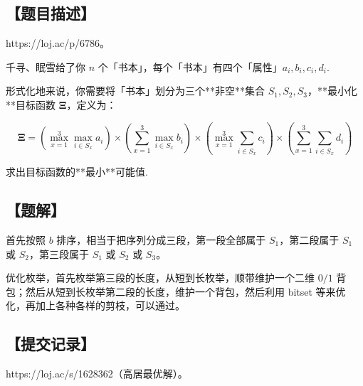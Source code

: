 \documentclass[UTF8,12pt,a4paper]{ctexart}
\begin{document}
	\subsection*{【题目描述】}
	
	https://loj.ac/p/6786。
	
	千寻、眠雪给了你 $n$ 个「书本」，每个「书本」有四个「属性」$a_i,b_i,c_i,d_i$.
	
	形式化地来说，你需要将「书本」划分为三个**非空**集合 $S_1,S_2,S_3$，**最小化**目标函数 $\mathbf{\Xi}$，定义为：
	
	$$
	\mathbf{\Xi}=\left(\max_{x=1}^3\max_{i\in S_x}a_i\right)\times\left(\sum_{x=1}^3\max_{i\in S_x}b_i\right)\times\left(\max_{x=1}^3\sum_{i\in S_x}c_i\right)\times\left(\sum_{x=1}^3\sum_{i\in S_x}d_i\right)
	$$
	
	求出目标函数的**最小**可能值.
	
	\subsection*{【题解】}
	
	首先按照 $b$ 排序，相当于把序列分成三段，第一段全部属于 $S_1$，第二段属于 $S_1$ 或 $S_2$，第三段属于 $S_1$ 或 $S_2$ 或 $S_3$。
	
	优化枚举，首先枚举第三段的长度，从短到长枚举，顺带维护一个二维 $0/1$ 背包；然后从短到长枚举第二段的长度，维护一个背包，然后利用 bitset 等来优化，再加上各种各样的剪枝，可以通过。
	
	\subsection*{【提交记录】}
	
	https://loj.ac/s/1628362（高居最优解）。
	
\end{document}
